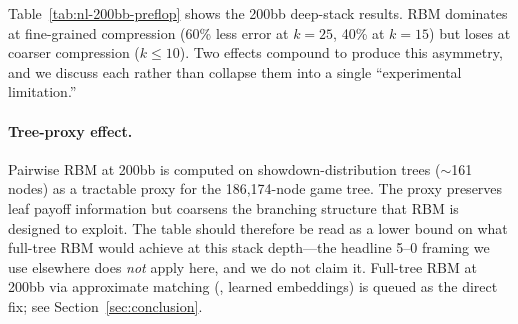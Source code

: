 \documentclass[11pt]{article}
\begin{document}
Table~\ref{tab:nl-200bb-preflop} shows the 200bb deep-stack results.
RBM dominates at fine-grained compression (60\% less error at
$k{=}25$, 40\% at $k{=}15$) but loses at coarser compression
($k \le 10$). Two effects compound to produce this asymmetry, and we
discuss each rather than collapse them into a single ``experimental
limitation.''

\paragraph{Tree-proxy effect.} Pairwise RBM at 200bb is computed on
showdown-distribution trees (${\sim}$161 nodes) as a tractable proxy
for the 186{,}174-node game tree. The proxy preserves leaf payoff
information but coarsens the branching structure that RBM is designed
to exploit. The table should therefore be read as a lower bound on
what full-tree RBM would achieve at this stack depth---the headline
5--0 framing we use elsewhere does \emph{not} apply here, and we do
not claim it. Full-tree RBM at 200bb via approximate matching
(\citealt{cuturi2013sinkhorn}, learned embeddings) is queued as the
direct fix; see Section~\ref{sec:conclusion}.
\end{document}
